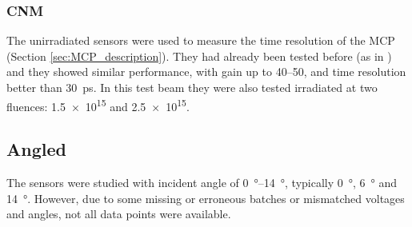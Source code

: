 \subsubsection{CNM}

The unirradiated sensors were used to measure the time resolution of the MCP (Section \ref{sec:MCP_description}). They had already been tested before (as in \cite{Allaire:2018bof}) and they showed similar performance, with gain up to \qtyrange{40}{50}{}, and time resolution better than \qty{30}{\pico\second}. In this test beam they were also tested irradiated at two fluences: \qty{1.5e15}{\neutroneq} and \qty{2.5e15}{\neutroneq}.

\begin{figure}[h!tbp]
    \centering
    \hfill
    \vfill
    \begin{minipage}[c]{.47\linewidth}
    \end{minipage}
    \hfill
    \begin{minipage}[c]{.5\linewidth}
\end{minipage}
\end{figure}


\subsection{Angled}

The sensors were studied with incident angle of \qtyrange{0}{14}{\degree}, typically \qty{0}{\degree}, \qty{6}{\degree} and \qty{14}{\degree}. However, due to some missing or erroneous batches or mismatched voltages and angles, not all data points were available.


